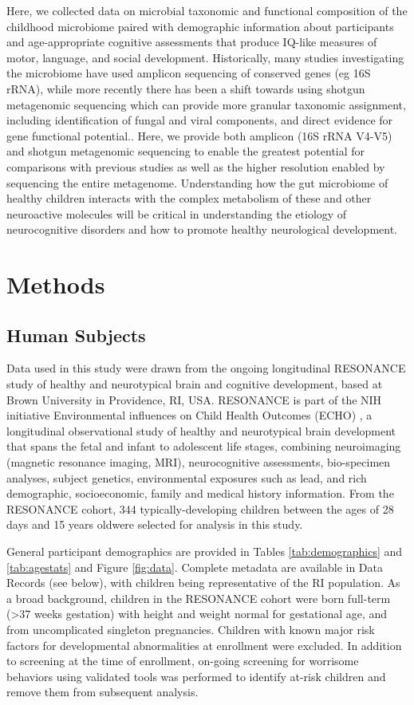 \documentclass[fleqn,10pt]{wlscirep}
\begin{document}
Here, we collected data on microbial taxonomic and functional composition
of the childhood microbiome paired with demographic information about participants
and age-appropriate cognitive assessments that produce IQ-like measures of motor, language, and social development.
Historically, many studies investigating the microbiome have used amplicon sequencing of conserved genes (eg 16S rRNA),
while more recently there has been a shift towards using shotgun metagenomic sequencing
which can provide more granular taxonomic assignment, including identification of fungal and viral components,
and direct evidence for gene functional potential..
Here, we provide both amplicon (16S rRNA V4-V5) and shotgun metagenomic sequencing
to enable the greatest potential for comparisons with previous studies
as well as the higher resolution enabled by sequencing the entire metagenome.
Understanding how the gut microbiome of healthy children
interacts with the complex metabolism of these and other neuroactive molecules
will be critical in understanding the etiology of neurocognitive disorders
and how to promote healthy neurological development.



\section*{Methods}

\subsection*{Human Subjects}

Data used in this study were drawn from the ongoing longitudinal RESONANCE study
of healthy and neurotypical brain and cognitive development,
based at Brown University in Providence, RI, USA.
RESONANCE is part of the NIH initiative Environmental influences on Child Health Outcomes (ECHO) \cite{Forrest2018-ud,Gillman2018-om},
a longitudinal observational study of healthy and neurotypical brain development
that spans the fetal and infant to adolescent life stages,
combining neuroimaging (magnetic resonance imaging, MRI), neurocognitive assessments, bio-specimen analyses, subject genetics,
environmental exposures such as lead, and rich demographic, socioeconomic, family and medical history information.
From the RESONANCE cohort, 344 typically-developing children
between the ages of 28 days and 15 years oldwere selected for analysis in this study. 

General participant demographics are provided in Tables \ref{tab:demographics} and \ref{tab:agestats} and Figure \ref{fig:data}.
Complete metadata are available in Data Records (see below), with children being representative of the RI population.
As a broad background, children in the RESONANCE cohort were born full-term (>37 weeks gestation)
with height and weight normal for gestational age, and from uncomplicated singleton pregnancies.
Children with known major risk factors for developmental abnormalities at enrollment were excluded.
In addition to screening at the time of enrollment,
on-going screening for worrisome behaviors using validated tools was performed
to identify at-risk children and remove them from subsequent analysis.
\end{document}
